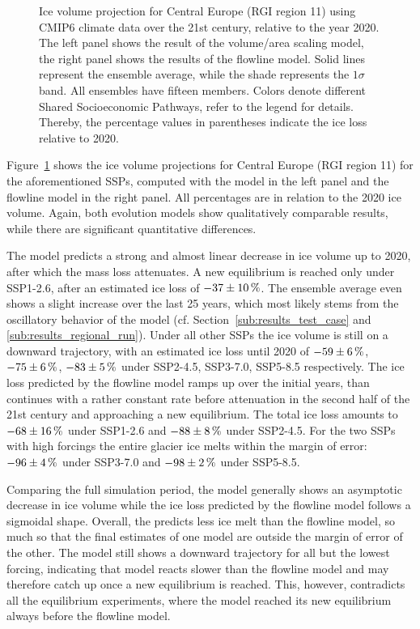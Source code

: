 \begin{figure}[b!]
          \caption{Ice volume projection for Central Europe (RGI region 11) using CMIP6 climate data over the 21st century, relative to the year 2020. The left panel shows the result of the volume/area scaling model, the right panel shows the results of the flowline model. Solid lines represent the ensemble average, while the shade represents the $1\sigma$ band. All ensembles have fifteen members. Colors denote different Shared Socioeconomic Pathways, refer to the legend for details. Thereby, the percentage values in parentheses indicate the ice loss relative to 2020.}
          \label{fig:cmip_alps}
      \end{figure}

      Figure~\ref{fig:cmip_alps} shows the ice volume projections for Central Europe (RGI region 11) for the aforementioned SSPs, computed with the \vas{} model in the left panel and the flowline model in the right panel. All percentages are in relation to the 2020 ice volume. Again, both evolution models show qualitatively comparable results, while there are significant quantitative differences.

      The \vas{} model predicts a strong and almost linear decrease in ice volume up to 2020, after which the mass loss attenuates. A new equilibrium is reached only under SSP1-2.6, after an estimated ice loss of $-37\SI{\pm10}{\percent}$. The ensemble average even shows a slight increase over the last 25 years, which most likely stems from the oscillatory behavior of the \vas{} model (cf. Section~\ref{sub:results_test_case} and \ref{sub:results_regional_run}). Under all other SSPs the ice volume is still on a downward trajectory, with an estimated ice loss until 2020 of $-59\SI{\pm6}{\percent}$, $-75\SI{\pm6}{\percent}$, $-83\SI{\pm5}{\percent}$ under SSP2-4.5, SSP3-7.0, SSP5-8.5 respectively. The ice loss predicted by the flowline model ramps up over the initial years, than continues with a rather constant rate before attenuation in the second half of the 21st century and approaching a new equilibrium. The total ice loss amounts to $-68\SI{\pm16}{\percent}$ under SSP1-2.6 and $-88\SI{\pm8}{\percent}$  under SSP2-4.5. For the two SSPs with high forcings the entire glacier ice melts within the margin of error: $-96\SI{\pm4}{\percent}$ under SSP3-7.0 and $-98\SI{\pm2}{\percent}$ under SSP5-8.5.

      Comparing the full simulation period, the \vas{} model generally shows an asymptotic decrease in ice volume while the ice loss predicted by the flowline model follows a sigmoidal shape. Overall, the \vas{} predicts less ice melt than the flowline model, so much so that the final estimates of one model are outside the margin of error of the other. The \vas{} model still shows a downward trajectory for all but the lowest forcing, indicating that \vas{} model reacts slower than the flowline model and may therefore catch up once a new equilibrium is reached. This, however, contradicts all the equilibrium experiments, where the \vas{} model reached its new equilibrium always before the flowline model.

